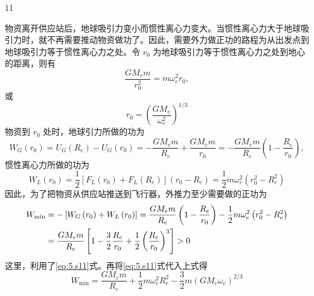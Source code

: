\begin{solution}{11}
\begin{subsolution}
物资离开供应站后，地球吸引力变小而惯性离心力变大。当惯性离心力大于地球吸引力时，就不再需要推动物资做功了。因此，需要外力做正功的路程为从出发点到地球吸引力等于惯性离心力之处。令 $r_{0}$ 为地球吸引力等于惯性离心力之处到地心的距离，则有
\begin{equation*}
\frac {G M _ {e} m}{r _ {0} ^ {2}} = m \omega_ {e} ^ {2} r _ {0},
\end{equation*}
或
\begin{equation}
r _ {0} = \left(\frac {G M _ {e}}{\omega_ {e} ^ {2}}\right) ^ {1 / 3}
\label{eq:5.s11}
\end{equation}
物资到 $r_{0}$ 处时，地球引力所做的功为
\begin{equation}
W _ {G} \left(r _ {0}\right) = U _ {G} \left(R _ {e}\right) - U _ {G} \left(r _ {0}\right) = - \frac {G M _ {e} m}{R _ {e}} + \frac {G M _ {e} m}{r _ {0}} = - \frac {G M _ {e} m}{R _ {e}} \left(1 - \frac {R _ {e}}{r _ {0}}\right),
\label{eq:6.s11}
\end{equation}
惯性离心力所做的功为
\begin{equation}
W _ {L} \left(r _ {0}\right) = \frac {1}{2} \left[ F _ {L} \left(r _ {0}\right) + F _ {L} \left(R _ {e}\right) \right] \left(r _ {0} - R _ {e}\right) = \frac {1}{2} m \omega_ {e} ^ {2} \left(r _ {0} ^ {2} - R _ {e} ^ {2}\right)
\label{eq:7.s11}
\end{equation}
因此，为了把物资从供应站推送到飞行器，外推力至少需要做的正功为
\begin{align}
W _ {\min} &= - \left[ W _ {G} \left(r _ {0}\right) + W _ {L} \left(r _ {0}\right) \right] = \frac {G M _ {e} m}{R _ {e}} \left(1 - \frac {R _ {e}}{r _ {0}}\right) - \frac {1}{2} m \omega_ {e} ^ {2} \left(r _ {0} ^ {2} - R _ {e} ^ {2}\right) \notag \\
&= \frac {G M _ {e} m}{R _ {e}} \left[ 1 - \frac {3}{2} \frac {R _ {e}}{r _ {0}} + \frac {1}{2} \left(\frac {R _ {e}}{r _ {0}}\right) ^ {3} \right] > 0
\notag
\end{align}
这里，利用了\eqref{eq:5.s11}式。再将\eqref{eq:5.s11}式代入上式得
\begin{equation}
W _ {\min} = \frac {G M _ {e} m}{R _ {e}} + \frac {1}{2} m \omega_ {e} ^ {2} R _ {e} ^ {2} - \frac {3}{2} m \left(G M _ {e} \omega_ {e}\right) ^ {2 / 3}
\label{eq:8.s11}
\end{equation}
\end{subsolution}


\end{solution}
